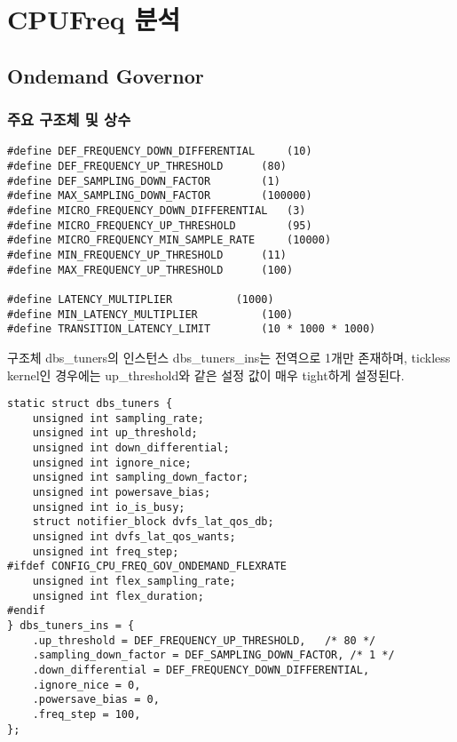 
\section{CPUFreq 분석}


\subsection{Ondemand Governor}


\subsubsection{주요 구조체 및 상수}

\begin{lstlisting}
#define DEF_FREQUENCY_DOWN_DIFFERENTIAL     (10)
#define DEF_FREQUENCY_UP_THRESHOLD      (80)
#define DEF_SAMPLING_DOWN_FACTOR        (1)
#define MAX_SAMPLING_DOWN_FACTOR        (100000)
#define MICRO_FREQUENCY_DOWN_DIFFERENTIAL   (3)
#define MICRO_FREQUENCY_UP_THRESHOLD        (95)
#define MICRO_FREQUENCY_MIN_SAMPLE_RATE     (10000)
#define MIN_FREQUENCY_UP_THRESHOLD      (11)
#define MAX_FREQUENCY_UP_THRESHOLD      (100)

#define LATENCY_MULTIPLIER          (1000)
#define MIN_LATENCY_MULTIPLIER          (100)
#define TRANSITION_LATENCY_LIMIT        (10 * 1000 * 1000)
\end{lstlisting}

\vspace{\baselineskip}

구조체 dbs\_tuners의 인스턴스 dbs\_tuners\_ins는 전역으로 1개만 존재하며, tickless kernel인 경우에는 up\_threshold와 같은 설정 값이 매우 tight하게 설정된다. 
\begin{lstlisting}
static struct dbs_tuners {
    unsigned int sampling_rate;
    unsigned int up_threshold;
    unsigned int down_differential;
    unsigned int ignore_nice;
    unsigned int sampling_down_factor;
    unsigned int powersave_bias;
    unsigned int io_is_busy;
    struct notifier_block dvfs_lat_qos_db;
    unsigned int dvfs_lat_qos_wants;
    unsigned int freq_step;
#ifdef CONFIG_CPU_FREQ_GOV_ONDEMAND_FLEXRATE
    unsigned int flex_sampling_rate;
    unsigned int flex_duration;
#endif
} dbs_tuners_ins = {
    .up_threshold = DEF_FREQUENCY_UP_THRESHOLD,   /* 80 */
    .sampling_down_factor = DEF_SAMPLING_DOWN_FACTOR, /* 1 */
    .down_differential = DEF_FREQUENCY_DOWN_DIFFERENTIAL,
    .ignore_nice = 0, 
    .powersave_bias = 0, 
    .freq_step = 100, 
};
\end{lstlisting}

